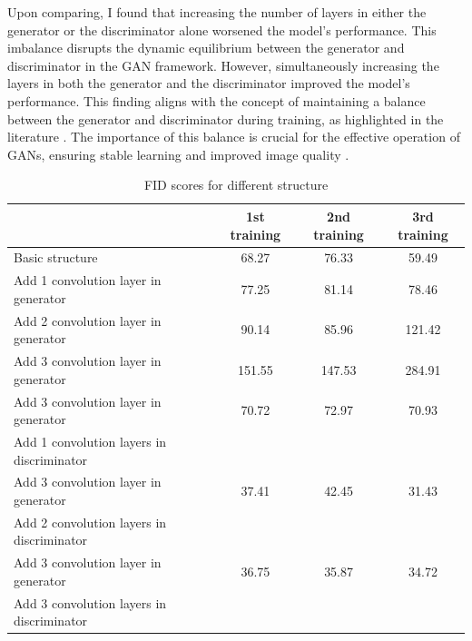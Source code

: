 Upon comparing, I found that increasing the number of layers in either the generator or the discriminator alone worsened the model’s performance. This imbalance disrupts the dynamic equilibrium between the generator and discriminator in the GAN framework. However, simultaneously increasing the layers in both the generator and the discriminator improved the model’s performance. This finding aligns with the concept of maintaining a balance between the generator and discriminator during training, as highlighted in the literature \citep{10.48550/arxiv.1703.10717}. The importance of this balance is crucial for the effective operation of GANs, ensuring stable learning and improved image quality \citep{10.48550/arxiv.2002.02112}.    

\begin{table}[h]
    \centering
    \caption{FID scores for different structure}
    \begin{tabular}{|l|c|c|c|}
      \hline
      & 1st training & 2nd training & 3rd training \\
      \hline
      Basic structure & 68.27 & 76.33 & 59.49 \\
      \hline
      Add 1 convolution layer in generator & 77.25 & 81.14 & 78.46 \\
      \hline
      Add 2 convolution layer in generator & 90.14 & 85.96 & 121.42 \\
      \hline
      Add 3 convolution layer in generator & 151.55 & 147.53 & 284.91 \\
      \hline
      \multicolumn{1}{|l|}{Add 3 convolution layer in generator} & 70.72 & 72.97 & 70.93 \\
      \multicolumn{1}{|l|}{Add 1 convolution layers in discriminator} & & & \\
      \hline
      \multicolumn{1}{|l|}{Add 3 convolution layer in generator} & 37.41 & 42.45 & 31.43 \\
      \multicolumn{1}{|l|}{Add 2 convolution layers in discriminator} & & & \\
      \hline
      \multicolumn{1}{|l|}{Add 3 convolution layer in generator} & 36.75 & 35.87 & 34.72 \\
      \multicolumn{1}{|l|}{Add 3 convolution layers in discriminator} & & & \\
      \hline
    \end{tabular}
\end{table}


